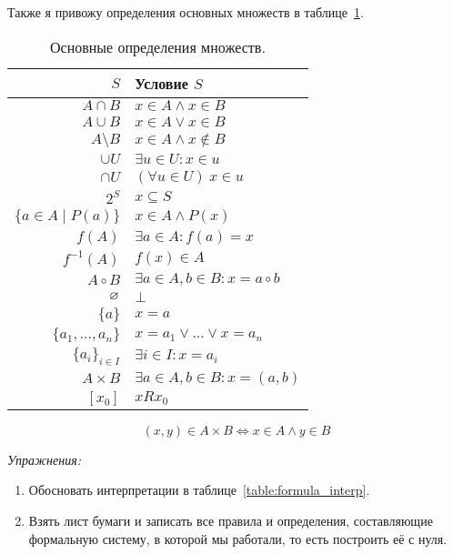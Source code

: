 Также я привожу определения основных множеств в таблице~\ref{table:set_def}.

\begin{table}
	\centering
	\begin{tabular}{r|l}
		$S$                        & Условие $S$                        \\\hline
		$A\cap B$                  & $x\in A\land x\in B$               \\
		$A\cup B$                  & $x\in A\lor x\in B$                \\
		$A\setminus B$             & $x\in A \land x\notin B$           \\
		$\cup U$                   & $\exists u\in U:x\in u$            \\
		$\cap U$                   & $(\forall u\in U)~x\in u$          \\
		$2^{S}$                    & $x\subseteq S$                     \\
		$\{a\in A\;\big|\; P(a)\}$ & $x\in A\land P(x)$                 \\
		$f(A)$                     & $\exists a\in A:f(a)=x$            \\
		$f^{-1}(A)$                & $f(x)\in A$                        \\
		$A\circ B$                 & $\exists a\in A,b\in B:x=a\circ b$ \\
		$\varnothing$                    & $\bot$                             \\
		$\{a\}$                    & $x=a$                              \\
		$\{a_1,...,a_{n}\}$        & $x=a_1\lor ...\lor x=a_{n}$        \\
		$\{a_{i}\}_{i\in I}$       & $\exists i\in I:x=a_{i}$           \\
		$A\times B$                & $\exists a\in A,b\in B:x=(a,b)$    \\
		$[x_0]$                    & $xRx_0$
	\end{tabular}

	\[
		(x,y)\in A\times B\iff x\in A\land y\in B
	\]

	\caption{Основные определения множеств.}\label{table:set_def}
\end{table}

\vspace{1em}
{\it Упражнения:}
\begin{enumerate}
	\item{}Обосновать интерпретации в таблице~\ref{table:formula_interp}.
	\item{}Взять лист бумаги и записать все правила и определения, составляющие
	формальную систему, в которой мы работали, то есть построить её с нуля.
\end{enumerate}
